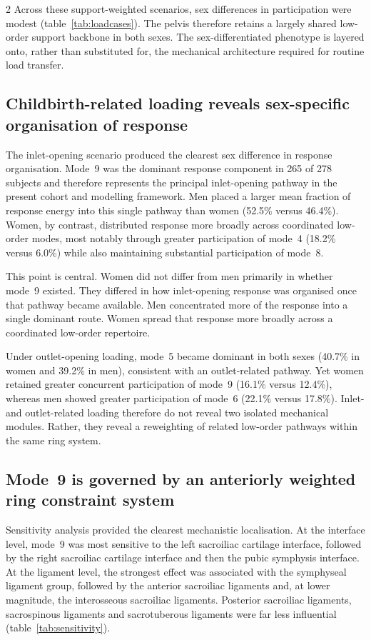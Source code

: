 \documentclass[openacc]{rsproca_new}
\begin{document}
\begin{multicols}{2}
Across these support-weighted scenarios, sex differences in participation were modest (table~\ref{tab:loadcases}). The pelvis therefore retains a largely shared low-order support backbone in both sexes. The sex-differentiated phenotype is layered onto, rather than substituted for, the mechanical architecture required for routine load transfer.

\subsection{Childbirth-related loading reveals sex-specific organisation of response}

The inlet-opening scenario produced the clearest sex difference in response organisation. Mode~9 was the dominant response component in 265 of 278 subjects and therefore represents the principal inlet-opening pathway in the present cohort and modelling framework. Men placed a larger mean fraction of response energy into this single pathway than women (52.5\% versus 46.4\%). Women, by contrast, distributed response more broadly across coordinated low-order modes, most notably through greater participation of mode~4 (18.2\% versus 6.0\%) while also maintaining substantial participation of mode~8.

This point is central. Women did not differ from men primarily in whether mode~9 existed. They differed in how inlet-opening response was organised once that pathway became available. Men concentrated more of the response into a single dominant route. Women spread that response more broadly across a coordinated low-order repertoire.

Under outlet-opening loading, mode~5 became dominant in both sexes (40.7\% in women and 39.2\% in men), consistent with an outlet-related pathway. Yet women retained greater concurrent participation of mode~9 (16.1\% versus 12.4\%), whereas men showed greater participation of mode~6 (22.1\% versus 17.8\%). Inlet- and outlet-related loading therefore do not reveal two isolated mechanical modules. Rather, they reveal a reweighting of related low-order pathways within the same ring system.

\subsection{Mode~9 is governed by an anteriorly weighted ring constraint system}

Sensitivity analysis provided the clearest mechanistic localisation. At the interface level, mode~9 was most sensitive to the left sacroiliac cartilage interface, followed by the right sacroiliac cartilage interface and then the pubic symphysis interface. At the ligament level, the strongest effect was associated with the symphyseal ligament group, followed by the anterior sacroiliac ligaments and, at lower magnitude, the interosseous sacroiliac ligaments. Posterior sacroiliac ligaments, sacrospinous ligaments and sacrotuberous ligaments were far less influential (table~\ref{tab:sensitivity}).


\end{multicols}
\end{document}
